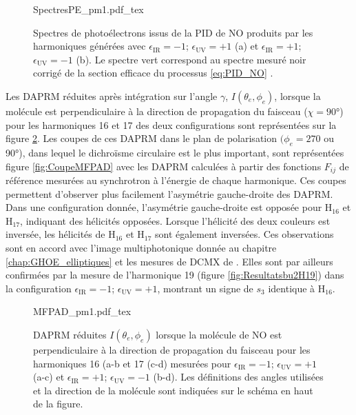 \begin{figure}[h]
\centering
\def\svgwidth{\textwidth}
{SpectresPE_pm1.pdf_tex}
\caption{Spectres de photoélectrons issus de la PID de NO produits par les harmoniques générées avec $\epsilon_{\text{IR}} = -1$; $\epsilon_{\text{UV}} = +1$ (a) et  $\epsilon_{\text{IR}} = +1$; $\epsilon_{\text{UV}} = -1$ (b). Le spectre vert correspond au spectre mesuré noir corrigé de la section efficace du processus \ref{eq:PID_NO} .}
\label{fig:SpectresPE_pm1}
\end{figure}

Les DAPRM réduites après intégration sur l'angle $\gamma$, $I(\theta_e, \phi_e)$, lorsque la molécule est perpendiculaire à la direction de propagation du faisceau ($\chi = 90$°) pour les harmoniques 16 et 17 des deux configurations sont représentées sur la figure \ref{fig:MFPAD_pm1}. Les coupes de ces DAPRM dans le plan de polarisation $(\phi_e = 270$ ou 90°), dans lequel le dichroïsme circulaire est le plus important, sont représentées figure \ref{fig:CoupeMFPAD} avec les DAPRM calculées à partir des fonctions $F_{ij}$ de référence mesurées au synchrotron à l'énergie de chaque harmonique. Ces coupes permettent d'observer plus facilement l'asymétrie gauche-droite des DAPRM. Dans une configuration donnée, l'asymétrie gauche-droite est opposée pour H$_{16}$ et H$_{17}$, indiquant des hélicités opposées. Lorsque l'hélicité des deux couleurs est inversée, les hélicités de  H$_{16}$ et H$_{17}$ sont également inversées. Ces observations sont en accord avec l'image multiphotonique donnée au chapitre \ref{chap:GHOE_elliptiques} et les mesures de DCMX de . Elles sont par ailleurs confirmées par la mesure de l'harmonique 19 (figure \ref{fig:Resultatsbu2H19}) dans la configuration $\epsilon_{\text{IR}} = -1$; $\epsilon_{\text{UV}} = +1$, montrant un signe de $s_3$ identique à H$_{16}$.

\begin{figure}
\centering
\def\svgwidth{0.8\textwidth}
{MFPAD_pm1.pdf_tex}
\caption{DAPRM réduites $I(\theta_e,\phi_e)$ lorsque la molécule de NO est perpendiculaire à la direction de propagation du faisceau pour les harmoniques 16 (a-b et 17 (c-d) mesurées pour $\epsilon_{\text{IR}} = -1$; $\epsilon_{\text{UV}} = +1$ (a-c) et $\epsilon_{\text{IR}} = +1$; $\epsilon_{\text{UV}} = -1$ (b-d). Les définitions des angles utilisées et la direction de la molécule sont indiquées sur le schéma en haut de la figure.}
\label{fig:MFPAD_pm1}
\end{figure}

